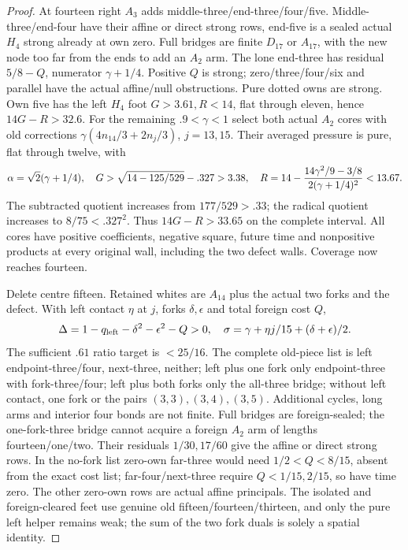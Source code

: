 \documentclass[11pt]{article}
\theoremstyle{definition}
\theoremstyle{remark}
\begin{document}
\begin{proof}
At fourteen right $A_3$ adds middle-three/end-three/four/five.
Middle-three/end-four have their affine or direct strong rows,
end-five is a sealed actual $H_4$ strong already at own zero.
Full bridges are finite $D_{17}$ or $A_{17}$, with the new
node too far from the ends to add an $A_2$ arm.
The lone end-three has residual $5/8-Q$, numerator
$\gamma+1/4$. Positive $Q$ is strong; zero/three/four/six
and parallel have the actual affine/null obstructions.
Pure dotted owns are strong. Own five has the left $H_4$
foot $G>3.61,R<14$, flat through eleven, hence $14G-R>32.6$.
For the remaining $.9<\gamma<1$ select both actual $A_2$
cores with old corrections
$\gamma(4n_{14}/3+2n_j/3)$, $j=13,15$.
Their averaged pressure is pure, flat through twelve, with
\[
 \alpha=\sqrt2(\gamma+1/4),\quad
 G>\sqrt{14-125/529}-.327>3.38,\quad
 R=14-{14\gamma^2/9-3/8\over2(\gamma+1/4)^2}<13.67.
\]
The subtracted quotient increases from $177/529> .33$;
the radical quotient increases to $8/75<.327^2$.
Thus $14G-R>33.65$ on the complete interval.
All cores have positive coefficients, negative square, future
time and nonpositive products at every original wall, including
the two defect walls. Coverage now reaches fourteen.

Delete centre fifteen. Retained whites are $A_{14}$ plus
the actual two forks and the defect. With left contact $\eta$
at $j$, forks $\delta,\epsilon$ and total foreign cost $Q$,
\[
 \Delta=1-q_{\rm left}-\delta^2-\epsilon^2-Q>0,
 \quad\sigma=\gamma+\eta j/15+(\delta+\epsilon)/2.
\]
The sufficient $.61$ ratio target is $<25/16$.
The complete old-piece list is left endpoint-three/four,
next-three, neither; left plus one fork only endpoint-three
with fork-three/four; left plus both forks only the all-three
bridge; without left contact, one fork or the pairs
$(3,3),(3,4),(3,5)$. Additional cycles, long arms and interior
four bonds are not finite. Full bridges are foreign-sealed;
the one-fork-three bridge cannot acquire a foreign $A_2$ arm
of lengths fourteen/one/two. Their residuals $1/30,17/60$
give the affine or direct strong rows.
In the no-fork list zero-own far-three would need
$1/2<Q<8/15$, absent from the exact cost list;
far-four/next-three require $Q<1/15,2/15$, so have time zero.
The other zero-own rows are actual affine principals.
The isolated and foreign-cleared feet use genuine old
fifteen/fourteen/thirteen, and only the pure left helper remains
weak; the sum of the two fork duals is solely a spatial identity.


\end{proof}
\end{document}
